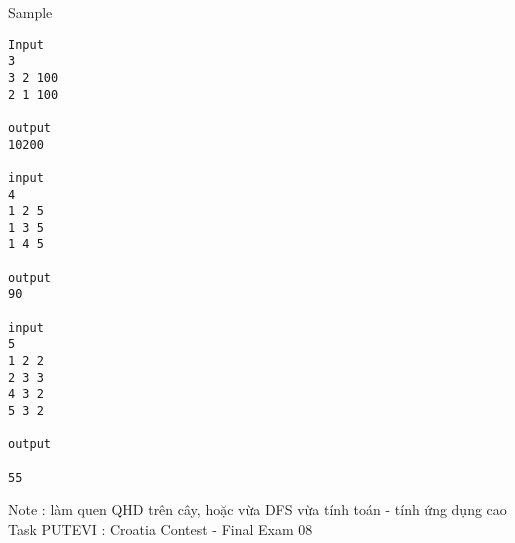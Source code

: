 Sample
\begin{verbatim}
Input 
3 
3 2 100 
2 1 100 
 
output 
10200 

input 
4 
1 2 5 
1 3 5 
1 4 5 

output 
90 

input 
5 
1 2 2 
2 3 3 
4 3 2 
5 3 2 
 
output 
 
55
\end{verbatim}

Note : làm quen QHD trên cây, hoặc vừa DFS vừa tính toán - tính ứng dụng cao
\\Task PUTEVI : Croatia Contest - Final Exam 08